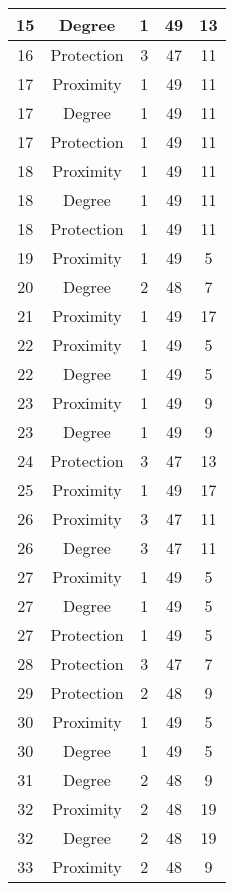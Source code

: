 \documentclass[results.tex]{subfiles}
\begin{document}
\begin{center}
\begin{tabular}{| c || c | c | c | c |}
    \hline
    15 & Degree & 1 & 49 & 13 \\ 
    \hline
    16 & Protection & 3 & 47 & 11 \\ 
    \hline
    17 & Proximity & 1 & 49 & 11 \\ 
    \hline
    17 & Degree & 1 & 49 & 11 \\ 
    \hline
    17 & Protection & 1 & 49 & 11 \\ 
    \hline
    18 & Proximity & 1 & 49 & 11 \\ 
    \hline
    18 & Degree & 1 & 49 & 11 \\ 
    \hline
    18 & Protection & 1 & 49 & 11 \\ 
    \hline
    19 & Proximity & 1 & 49 & 5 \\ 
    \hline
    20 & Degree & 2 & 48 & 7 \\ 
    \hline
    21 & Proximity & 1 & 49 & 17 \\ 
    \hline
    22 & Proximity & 1 & 49 & 5 \\ 
    \hline
    22 & Degree & 1 & 49 & 5 \\ 
    \hline
    23 & Proximity & 1 & 49 & 9 \\ 
    \hline
    23 & Degree & 1 & 49 & 9 \\ 
    \hline
    24 & Protection & 3 & 47 & 13 \\ 
    \hline
    25 & Proximity & 1 & 49 & 17 \\ 
    \hline
    26 & Proximity & 3 & 47 & 11 \\ 
    \hline
    26 & Degree & 3 & 47 & 11 \\ 
    \hline
    27 & Proximity & 1 & 49 & 5 \\ 
    \hline
    27 & Degree & 1 & 49 & 5 \\ 
    \hline
    27 & Protection & 1 & 49 & 5 \\ 
    \hline
    28 & Protection & 3 & 47 & 7 \\ 
    \hline
    29 & Protection & 2 & 48 & 9 \\ 
    \hline
    30 & Proximity & 1 & 49 & 5 \\ 
    \hline
    30 & Degree & 1 & 49 & 5 \\ 
    \hline
    31 & Degree & 2 & 48 & 9 \\ 
    \hline
    32 & Proximity & 2 & 48 & 19 \\ 
    \hline
    32 & Degree & 2 & 48 & 19 \\ 
    \hline
    33 & Proximity & 2 & 48 & 9 \\ 
    \hline

\end{tabular}
\end{center}
\end{document}
